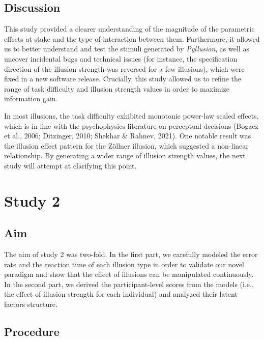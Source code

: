 \documentclass[
  man,floatsintext]{apa6}
\begin{document}
\hypertarget{discussion}{%
\subsection{Discussion}\label{discussion}}

This study provided a clearer understanding of the magnitude of the parametric effects at stake and the type of interaction between them. Furthermore, it allowed us to better understand and test the stimuli generated by \emph{Pyllusion}, as well as uncover incidental bugs and technical issues (for instance, the specification direction of the illusion strength was reversed for a few illusions), which were fixed in a new software release. Crucially, this study allowed us to refine the range of task difficulty and illusion strength values in order to maximize information gain.

In most illusions, the task difficulty exhibited monotonic power-law scaled effects, which is in line with the psychophysics literature on perceptual decisions (Bogacz et al., 2006; Ditzinger, 2010; Shekhar \& Rahnev, 2021). One notable result was the illusion effect pattern for the Zöllner illusion, which suggested a non-linear relationship. By generating a wider range of illusion strength values, the next study will attempt at clarifying this point.

\hypertarget{study-2}{%
\section{Study 2}\label{study-2}}

\hypertarget{aim-1}{%
\subsection{Aim}\label{aim-1}}

The aim of study 2 was two-fold. In the first part, we carefully modeled the error rate and the reaction time of each illusion type in order to validate our novel paradigm and show that the effect of illusions can be manipulated continuously. In the second part, we derived the participant-level scores from the models (i.e., the effect of illusion strength for each individual) and analyzed their latent factors structure.

\hypertarget{procedure-1}{%
\subsection{Procedure}\label{procedure-1}}
\end{document}
